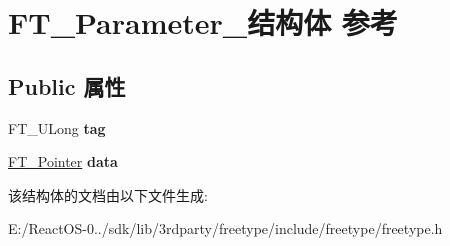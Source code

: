 \hypertarget{struct_f_t___parameter__}{}\section{F\+T\+\_\+\+Parameter\+\_\+结构体 参考}
\label{struct_f_t___parameter__}
\subsection*{Public 属性}
\begin{DoxyCompactItemize}
\item 
\mbox{\label{struct_f_t___parameter___a5a53ef2652683a2cd9ee6a0a694cb76b}} 
F\+T\+\_\+\+U\+Long {\bfseries tag}
\item 
\mbox{\label{struct_f_t___parameter___a930c8885bd25be8d054443153c817c13}} 
\hyperlink{interfacevoid}{F\+T\+\_\+\+Pointer} {\bfseries data}
\end{DoxyCompactItemize}


该结构体的文档由以下文件生成\+:\begin{DoxyCompactItemize}
\item 
E\+:/\+React\+O\+S-\/0../sdk/lib/3rdparty/freetype/include/freetype/freetype.\+h\end{DoxyCompactItemize}
